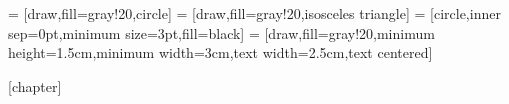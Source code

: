\def\TikZ{Ti{\em k}Z\@}
\def\PGF{{\scriptsize PGF}\@}
\def\PGFPLOTS{{\scriptsize PGFPLOTS}\@}
\def\GNUPLOT{{\scriptsize GNUPLOT}\@}
\newcommand{\bmath}{\begin{equation}}
\newcommand{\emath}{\end{equation}}
\newcommand{\bmathnt}{\begin{equation*}}%
\newcommand{\emathnt}{\end{equation*}}%
\newcommand{\bbmtx}{\begin{bmatrix}}
\newcommand{\ebmtx}{\end{bmatrix}}
\newcommand{\vect}[1]{\boldsymbol{#1}}
\newcommand{\eqpage}[1]{Eq.~\ref{#1} page~\pageref{#1}}
\newcommand{\eq}[1]{Eq.~\eqref{#1}}
\DeclareMathOperator*{\argmax}{arg\,max}
\DeclareMathOperator*{\argmin}{arg\,min}
\newlength\dlf
\newcommand\alignedbox[2]{
  &
  \begingroup
  \settowidth\dlf{$\displaystyle #1$}
  \addtolength\dlf{\fboxsep+\fboxrule}
  \hspace{-\dlf}
  \boxed{#1 #2}
  \endgroup
}
\newcommand{\tr}[1]{\textup{tr}(#1)} %
\newcommand{\rank}[1]{\textup{rank}(#1)} %
\newcommand{\diag}[1]{\textup{diag}(#1)} %



\newcommand{\inputTikZ}[1]{%
  \tikzsetnextfilename{#1}
}

 = [draw,fill=gray!20,circle]
 = [draw,fill=gray!20,isosceles triangle]
 = [circle,inner sep=0pt,minimum size=3pt,fill=black]
 = [draw,fill=gray!20,minimum height=1.5cm,minimum width=3cm,text width=2.5cm,text centered]

\theoremheaderfont{\normalfont\bfseries}
\theorembodyfont{\normalfont}
\theoremstyle{break}
\def\theoremframecommand{{\color{examplecolor}\vrule width 5pt \hspace{5pt}}}
[chapter]
\newenvironment{example}[1]{%
		\begin{exa}[#1]
}{%
		\end{exa}
}
